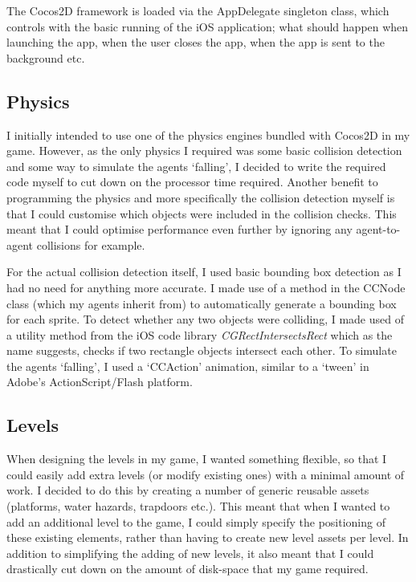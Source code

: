 \documentclass[a4paper,oneside]{report}
\begin{document}
The Cocos2D framework is loaded via the AppDelegate singleton class, which controls with the basic running of the iOS application; what should happen when launching the app, when the user closes the app, when the app is sent to the background etc. 

\subsection{Physics}

I initially intended to use one of the physics engines bundled with Cocos2D in my game. However, as the only physics I required was some basic collision detection and some way to simulate the agents `falling', I decided to write the required code myself to cut down on the processor time required. Another benefit to programming the physics and more specifically the collision detection myself is that I could customise which objects were included in the collision checks. This meant that I could optimise performance even further by ignoring any agent-to-agent collisions for example.

For the actual collision detection itself, I used basic bounding box detection as I had no need for anything more accurate. I made use of a method in the CCNode class (which my agents inherit from) to automatically generate a bounding box for each sprite. To detect whether any two objects were colliding, I made used of a utility method from the iOS code library \emph{CGRectIntersectsRect} which as the name suggests, checks if two rectangle objects intersect each other. To simulate the agents `falling', I used a `CCAction' animation, similar to a `tween' in Adobe's ActionScript/Flash platform. 

\subsection{Levels} 

When designing the levels in my game, I wanted something flexible, so that I could easily add extra levels (or modify existing ones) with a minimal amount of work. I decided to do this by creating a number of generic reusable assets (platforms, water hazards, trapdoors etc.). This meant that when I wanted to add an additional level to the game, I could simply specify the positioning of these existing elements, rather than having to create new level assets per level. In addition to simplifying the adding of new levels, it also meant that I could drastically cut down on the amount of disk-space that my game required.
\end{document}
